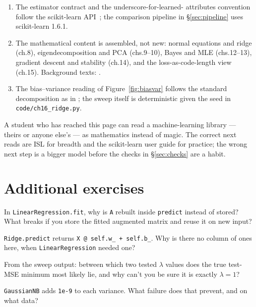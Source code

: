 \begin{enumerate}
\item The estimator contract and the underscore-for-learned-
attributes convention follow the scikit-learn API~\cite{sklearn};
the comparison pipeline in \S\ref{sec:pipeline} uses scikit-learn
1.6.1.
\item The mathematical content is assembled, not new: normal
equations and ridge (ch.8), eigendecomposition and PCA (chs.9--10),
Bayes and MLE (chs.12--13), gradient descent and stability
(ch.14), and the loss-as-code-length view (ch.15). Background
texts: \cite{mml,vmls,axler,cs229,cvxbook}.
\item The bias--variance reading of Figure~\ref{fig:biasvar} follows
the standard decomposition as in \cite{stat110,mml}; the sweep
itself is deterministic given the seed in
\texttt{code/ch16\_ridge.py}.
\end{enumerate}

{A student who has reached this page can read a
machine-learning library --- theirs or anyone else's --- as
mathematics instead of magic. The correct next reads are ISL for
breadth and the scikit-learn user guide for practice; the wrong
next step is a bigger model before the checks in \S\ref{sec:checks}
are a habit.}

\section*{Additional exercises}

\begin{exercise}[easy]
In \texttt{LinearRegression.fit}, why is \texttt{A} rebuilt inside
\texttt{predict} instead of stored? What breaks if you store the
fitted augmented matrix and reuse it on new input?
\end{exercise}

\begin{exercise}[easy]
\texttt{Ridge.predict} returns \texttt{X @ self.w\_ + self.b\_}.
Why is there no column of ones here, when
\texttt{LinearRegression} needed one?
\end{exercise}

\begin{exercise}[easy]
From the sweep output: between which two tested $\lambda$ values
does the true test-MSE minimum most likely lie, and why can't you
be sure it is exactly $\lambda=1$?
\end{exercise}

\begin{exercise}[easy]
\texttt{GaussianNB} adds \texttt{1e-9} to each variance. What
failure does that prevent, and on what data?
\end{exercise}

